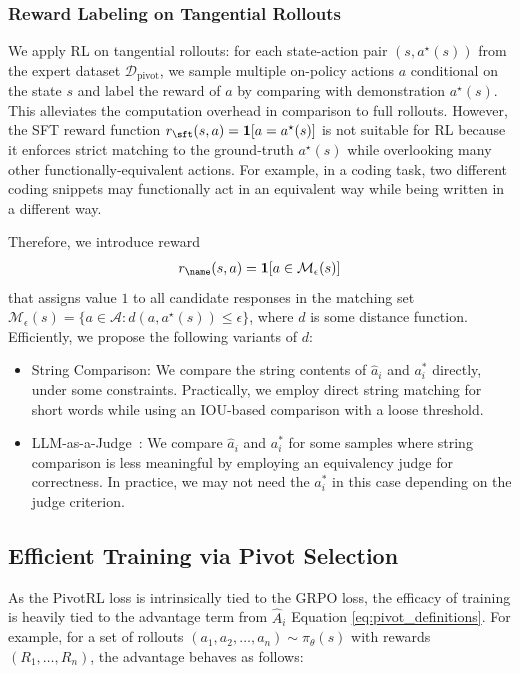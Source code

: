 \subsubsection{Reward Labeling on Tangential Rollouts}
We apply RL on tangential rollouts: for each state-action pair $(s,a^\star(s))$ from the expert dataset $\mathcal{D}_{\text{pivot}}$, we sample multiple on-policy actions $a$ conditional on the state $s$ and label the reward of $a$ by comparing with demonstration $a^\star(s)$. This alleviates the computation overhead in comparison to full rollouts. However, the SFT reward function $r_{\sft}(s,a) = \mathbf{1}[a = a^\star(s)]$ is not suitable for RL because it enforces strict matching to the ground-truth $a^\star(s)$ while overlooking many other functionally-equivalent actions. For example, in a coding task, two different coding snippets may functionally act in an equivalent way while being written in a different way.

Therefore, we introduce reward 
\begin{align}\label{eq:pivotrl-reward}
    r_{\name}(s, a) = \mathbf{1}[a\in \mathcal M_\epsilon(s)]
\end{align}
that assigns value $1$ to all candidate responses in the matching set
$\mathcal M_\epsilon(s)
=
\{a\in\mathcal A:d(a,a^\star(s))\leq \epsilon\}$, 
where $d$ is some distance function. Efficiently, we propose the following variants of $d$:
\begin{itemize}
    \item String Comparison: We compare the string contents of $\hat{a}_i$ and $a_i^*$ directly, under some constraints. Practically, we employ direct string matching for short words while using an IOU-based comparison with a loose threshold.
    \item LLM-as-a-Judge~\citep{zheng2023judging, lee2023rlaif,tan2025judgebench}: We compare $\hat{a}_i$ and $a_i^*$ for some samples where string comparison is less meaningful by employing an equivalency judge for correctness. In practice, we may not need the $a_i^*$ in this case depending on the judge criterion.
\end{itemize}





\subsection{Efficient Training via Pivot Selection}
As the PivotRL loss is intrinsically tied to the GRPO loss, the efficacy of training is heavily tied to the advantage term from $\hat{A}_i$ Equation \ref{eq:pivot_definitions}. For example, for a set of rollouts $(a_1, a_2, \dots, a_n) \sim \pi_{\theta}(s)$ with rewards $(R_1,\dots,R_n)$, the advantage behaves as follows:

